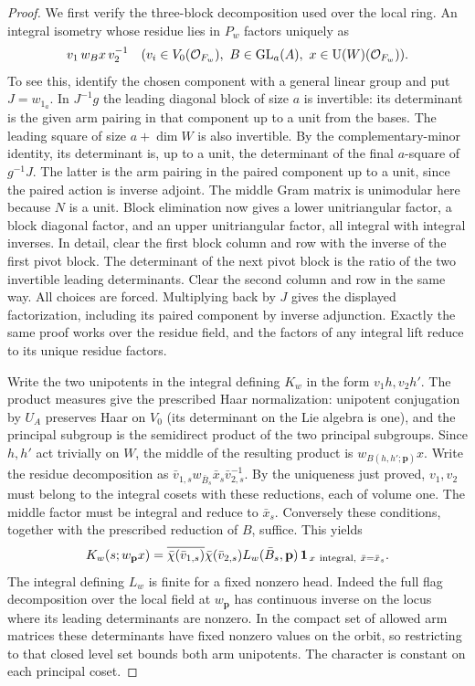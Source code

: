 \documentclass[a4paper,11pt]{article}
\theoremstyle{definition}
\theoremstyle{remark}
\numberwithin{equation}{section}
\begin{document}
\begin{proof}
We first verify the three-block decomposition used over the local
ring. An integral isometry whose residue lies in \(P_w\) factors
uniquely as
\[
              v_1\, w_B x\,v_2^{-1}
       \quad(v_i\in V_0(\mathcal O_{F_w}),\
        B\in {\rm GL}_a(A),\ x\in\mathrm U(W)(\mathcal O_{F_w})).
\]
To see this, identify the chosen component with a general linear
group and put \(J=w_{1_a}\). In \(J^{-1}g\) the leading diagonal
block of size \(a\) is invertible: its determinant is the given
arm pairing in that component up to a unit from the bases.
The leading square of size \(a+\dim W\) is also invertible.
By the complementary-minor identity, its determinant is, up to
a unit, the determinant of the final \(a\)-square of \(g^{-1}J\).
The latter is the arm pairing in the paired component up to a
unit, since the paired action is inverse adjoint. The middle
Gram matrix is unimodular here because \(N\) is a unit.
Block elimination now gives a lower unitriangular factor, a
block diagonal factor, and an upper unitriangular factor, all
integral with integral inverses. In detail, clear the first
block column and row with the inverse of the first pivot block.
The determinant of the next pivot block is the ratio of the
two invertible leading determinants. Clear the second column
and row in the same way. All choices are forced. Multiplying
back by \(J\) gives the displayed factorization, including its
paired component by inverse adjunction. Exactly the same proof
works over the residue field, and the factors of any integral
lift reduce to its unique residue factors.

Write the two unipotents in the integral defining \(K_w\) in
the form \(v_1h,v_2h'\). The product measures give the prescribed
Haar normalization: unipotent conjugation by \(U_A\) preserves
Haar on \(V_0\) (its determinant on the Lie algebra is one), and
the principal subgroup is the semidirect product of the two
principal subgroups. Since \(h,h'\) act trivially on \(W\),
the middle of the resulting product is \(w_{B(h,h';\mathbf p)}x\).
Write the residue decomposition as
\(\bar v_{1,s} w_{\bar B_s}\bar x_s \bar v_{2,s}^{-1}\).
By the uniqueness just proved, \(v_1,v_2\) must belong to the
integral cosets with these reductions, each of volume one.
The middle factor must be integral and reduce to \(\bar x_s\).
Conversely these conditions, together with the prescribed
reduction of \(B\), suffice. This yields
\[
 K_w(s;w_{\mathbf p}x)
   =\overline{\bar\chi(\bar v_{1,s})}\bar\chi(\bar v_{2,s})
          L_w(\bar B_s,\mathbf p)\,
       {\bf1}_{\,x\ {\rm integral},\ \bar x=\bar x_s}.
\]
The integral defining \(L_w\) is finite for a fixed nonzero head.
Indeed the full flag decomposition over the local field at
\(w_{\mathbf p}\) has continuous inverse on the locus where its
leading determinants are nonzero. In the compact set of allowed
arm matrices these determinants have fixed nonzero values on the
orbit, so restricting to that closed level set bounds both arm
unipotents. The character is constant on each principal coset.


\end{proof}
\end{document}
